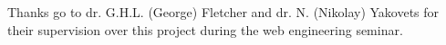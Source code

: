 Thanks go to dr. G.H.L. (George) Fletcher and dr. N. (Nikolay) Yakovets for their supervision over this project during the web engineering seminar.